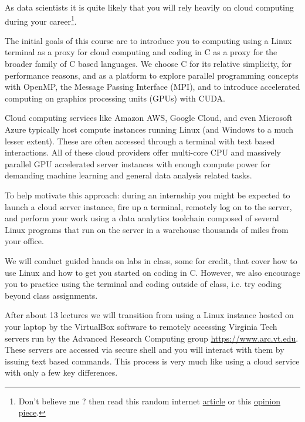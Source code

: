 

As data scientists it is quite likely that you will rely heavily on cloud computing during your career\footnote{Don't believe me ? then read this random internet  \href{https://spectrum.ieee.org/the-institute/ieee-member-news/software-engineering-grads-lack-the-skills-startups-need}{article} or this \href{https://towardsdatascience.com/why-should-every-engineer-consider-start-developing-analytical-and-programming-skills-d510eadb146c}{opinion piece}.}. 

The initial goals of this course are to introduce you to computing using a Linux terminal as a proxy for cloud computing and coding in C as a proxy for the broader family of C based languages. We choose C for its relative simplicity, for performance reasons, and as a platform to explore parallel programming concepts with OpenMP, the Message Passing Interface (MPI), and to introduce accelerated computing on graphics processing units (GPUs) with CUDA.

Cloud computing services like Amazon AWS, Google Cloud, and even Microsoft Azure typically host compute instances running Linux (and Windows to a much lesser extent). These are often accessed through a terminal with text based interactions. All of these cloud providers offer multi-core CPU and massively parallel GPU accelerated server instances with enough compute power for demanding machine learning and general data analysis related tasks.

To help motivate this approach: during an internship you might be expected to launch a cloud server instance, fire up a terminal, remotely log on to the server, and perform your work using a data analytics toolchain composed of several Linux programs that run on the server in a warehouse thousands of miles from your office. 

We will conduct guided hands on labs in class, some for credit, that cover how to use Linux and how to get you started on coding in C. However, we also encourage you to practice using the terminal and coding outside of class, i.e. try coding beyond class assignments.

After about 13 lectures we will transition from using a Linux instance hosted on your laptop by the VirtualBox  software to remotely accessing Virginia Tech servers run by the Advanced Research Computing group \href{https://www.arc.vt.edu}{https://www.arc.vt.edu}. These servers are accessed via secure shell and you will interact with them by issuing text based commands. This process is very much like using a cloud service with only a few key differences.


